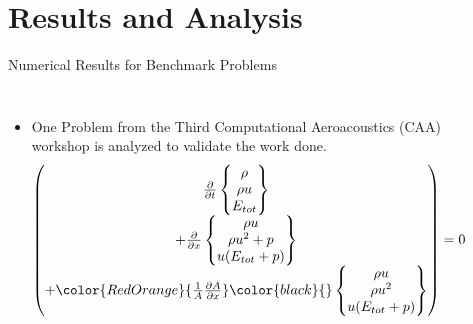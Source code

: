 \section{Results and Analysis}
\begin{frame}{Numerical Results for Benchmark Problems}
  \begin{columns}
      \begin{itemize}
        \item One Problem from the Third Computational Aeroacoustics (CAA) workshop is analyzed
              to validate the work done.
        \begin{equation*}
          \left(\begin{matrix}
              \frac{\partial{}}{\partial{t}} 
              \left\{\begin{matrix}
                  \rho \\
                  \rho{u} \\
                  E_{tot}
            \end{matrix}\right\}\\
             +\frac{\partial{}}{\partial{x}}
              \left\{\begin{matrix}
                  \rho{u} \\
                  \rho{u^2}+p \\
                  u(E_{tot}+p)
            \end{matrix}\right\} \\
            +\color{RedOrange}{\frac{1}{A}\frac{\partial{A}}{\partial{x}}}\color{black}{}
              \left\{\begin{matrix}
                  \rho{u} \\
                  \rho{u^2} \\
                  u(E_{tot}+p)
            \end{matrix}\right\}
          \end{matrix}\right)= 0
        \end{equation*} 
      \end{itemize}   
      \begin{figure}[hbt!]
          \centering
          \includegraphics[width=1.0\textwidth]{Figures/Area_dX}

\end{figure}
\end{columns}
\end{frame}
